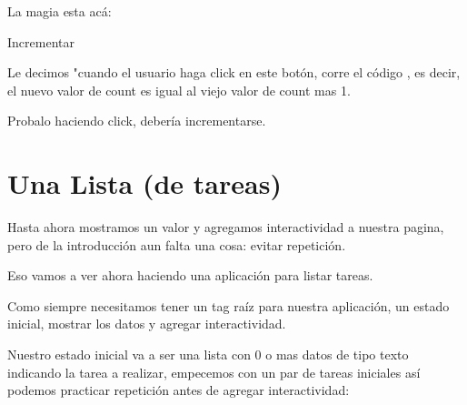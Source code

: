 \documentclass[letterpaper,10pt,spanish]{sphinxmanual}
\begin{document}
La magia esta acá:

%
\begin{sphinxVerbatim}[commandchars=\\\{\}]
 Incrementar
\end{sphinxVerbatim}

Le decimos "cuando el usuario haga click en este botón, corre el código
, es decir, el nuevo valor de count es igual al viejo valor de
count mas 1.

Probalo haciendo click, debería incrementarse.


\section{Una Lista (de tareas)}
\label{\detokenize{un-poco-de-logica-a-la-vista:una-lista-de-tareas}}
Hasta ahora mostramos un valor y agregamos interactividad a nuestra pagina,
pero de la introducción aun falta una cosa: evitar repetición.

Eso vamos a ver ahora haciendo una aplicación para listar tareas.

Como siempre necesitamos tener un tag raíz para nuestra aplicación, un estado
inicial, mostrar los datos y agregar interactividad.

Nuestro estado inicial va a ser una lista con 0 o mas datos de tipo texto
indicando la tarea a realizar, empecemos con un par de tareas iniciales así
podemos practicar repetición antes de agregar interactividad:

%
\begin{sphinxVerbatim}[commandchars=\\\{\}]
   
     
     
         \PYG{p}{[}
        \PYG{p}{]}
\end{sphinxVerbatim}
\end{document}
